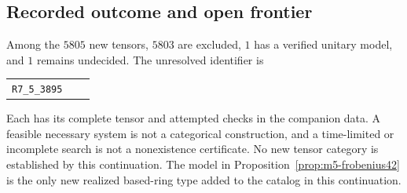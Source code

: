 \subsection{Recorded outcome and open frontier}
Among the $5805$ new tensors, $5803$ are excluded, $1$ has a verified unitary model, and $1$ remains undecided.
The unresolved identifier is
\begin{center}\small
\begin{tabular}{@{}l l l@{}}
\texttt{R7\_5\_3895} &  & \\
\end{tabular}
\end{center}
Each has its complete tensor and attempted checks in the companion data.
A feasible necessary system is not a categorical construction, and a
time-limited or incomplete search is not a nonexistence certificate.
No new tensor category is established by this continuation. The model in
Proposition~\ref{prop:m5-frobenius42} is the only new realized based-ring
type added to the catalog in this continuation.
